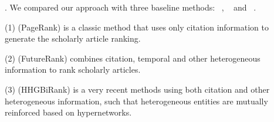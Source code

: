 


.
We compared our approach \ensemblerank with three baseline methods: \pagerank~\cite{Brin98:PageRank}, \futurerank~\cite{sayyadi09} and \hhgrank~\cite{Liang16AAAI}.

\noindent
(1) \pagerank (PageRank) is a classic method that uses only citation information to generate the scholarly article ranking.


\noindent
(2) \futurerank (FutureRank) combines citation, temporal and other heterogeneous information to rank scholarly articles.

\noindent
(3) \hhgrank (HHGBiRank) is a very recent methods using both citation and other heterogeneous information, such that heterogeneous entities are mutually reinforced based on hypernetworks.


